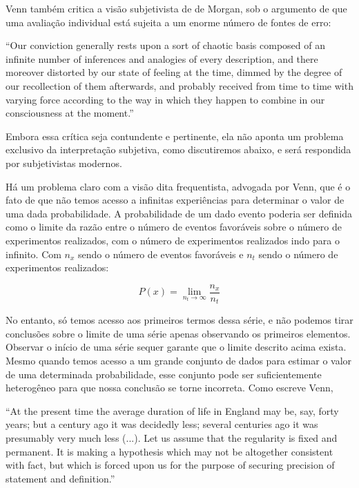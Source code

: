 \documentclass[12pt,a4paper]{article}
\begin{document}
Venn também critica a visão subjetivista de de Morgan, sob
o argumento de que uma avaliação individual está sujeita a
um enorme número de fontes de erro:

``Our conviction generally rests upon a sort of chaotic basis
composed of an infinite number of inferences and analogies
of every description, and there moreover distorted by our
state of feeling at the time, dimmed by the degree of our
recollection of them afterwards, and probably received
from time to time with varying force according to the way in
which they happen to combine in our consciousness at the 
moment.''\cite{Venn1866}

Embora essa crítica seja contundente e pertinente, ela não aponta um problema exclusivo da interpretação subjetiva, como
discutiremos abaixo, e será respondida por subjetivistas modernos.

Há um problema claro com a visão dita frequentista, advogada por Venn, que é o fato de que não temos 
acesso a infinitas experiências para determinar o valor
de uma dada probabilidade. A probabilidade de um dado evento poderia ser definida como o limite da razão entre o número de eventos
favoráveis sobre o número de experimentos realizados, com o número de experimentos realizados indo para o infinito. Com 
$n_x$ sendo o número de eventos favoráveis e $n_t$ sendo o número de experimentos realizados:

\begin{equation}
	P(x) = \lim_{n_t \rightarrow \infty} \frac{n_x}{n_t} 
\end{equation}

No entanto, só temos acesso aos primeiros termos dessa série, e não podemos tirar conclusões sobre o limite de uma série apenas
observando os primeiros elementos. Observar o início de uma série sequer garante que o limite descrito acima exista.
Mesmo quando temos acesso a um grande conjunto de dados para estimar o valor de uma determinada
probabilidade, esse conjunto pode ser suficientemente heterogêneo para que nossa conclusão se torne incorreta. Como escreve Venn,

``At the present time the average duration of life in England may be, say, forty years; but a century ago it was decidedly less;
several centuries ago it was presumably very much less (...). Let us assume that the regularity is fixed and permanent. It is
making a hypothesis which may not be altogether consistent with fact, but which is forced upon us for the purpose of securing
precision of statement and definition.''\cite{Venn1866}
\end{document}

